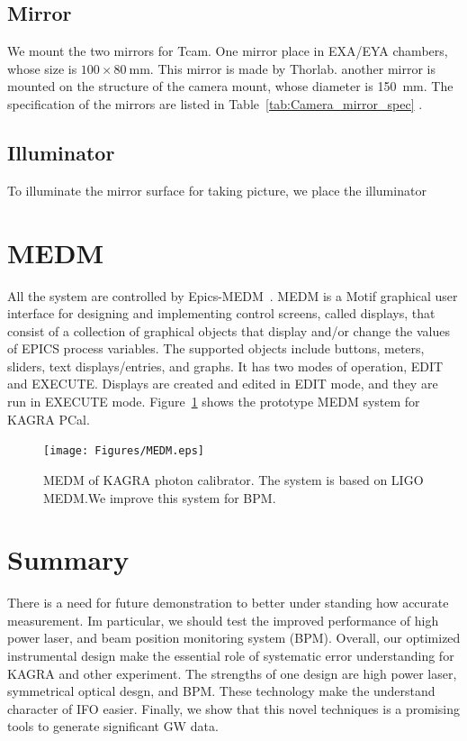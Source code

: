 \subsection{Mirror}
We mount the two mirrors for Tcam. One mirror place in EXA/EYA chambers, whose size is $100 \times 80~\mathrm{mm}$. This mirror is made by Thorlab. another mirror is mounted on the structure of the camera mount, whose diameter is 150~mm. The specification of the mirrors are listed in Table~\ref{tab:Camera_mirror_spec} .


\subsection{Illuminator}
To illuminate the mirror surface for taking picture, we place the illuminator

\section{MEDM} \label{MEDM}
All the system are controlled by Epics-MEDM~\cite{MEDM}. 
MEDM is a Motif graphical user interface for designing and implementing control screens, called displays, that consist of a collection of graphical objects that display and/or change the values of EPICS process variables. The supported objects include buttons, meters, sliders, text displays/entries, and graphs. It has two modes of operation, EDIT and EXECUTE. Displays are created and edited in EDIT mode, and they are run in EXECUTE mode.
Figure~\ref{fig:MEDM} shows the prototype MEDM system for KAGRA PCal.
\begin{figure}
\begin{center}
\texttt{[image: Figures/MEDM.eps]}
\caption{MEDM of KAGRA photon calibrator. The system is based on LIGO MEDM.We improve this system for BPM.}
\label{fig:MEDM} 
\end{center}
\end{figure}

\section{Summary}
There is a need for future demonstration to better under standing how accurate measurement.
Im particular, we should test the improved performance of high power laser, and  beam position monitoring system (BPM).
Overall, our optimized instrumental design make the essential role of systematic error understanding for KAGRA and other experiment.
The strengths of one design are high power laser, symmetrical optical desgn, and BPM.
These technology make the understand character of IFO easier.
Finally, we show that this novel techniques is a promising tools to generate significant GW data.
